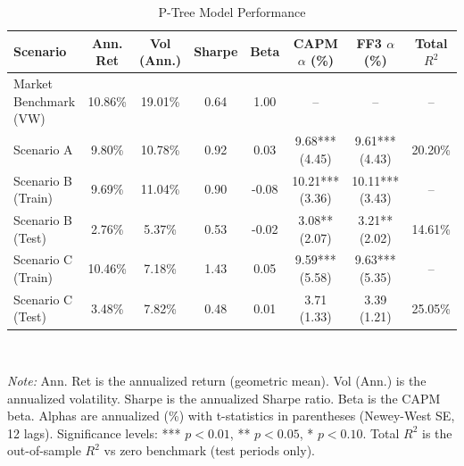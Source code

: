 \begin{table}[!ht]
\centering
\caption{P-Tree Model Performance}
\label{tab:performance}
\begin{tabular}{l *{7}{c}}
\hline
Scenario & Ann. Ret & Vol (Ann.) & Sharpe & Beta & CAPM $\alpha$ (\%) & FF3 $\alpha$ (\%) & Total $R^2$ \\
\hline
Market Benchmark (VW) & 10.86\% & 19.01\% & 0.64 & 1.00 & -- & -- & -- \\
Scenario A & 9.80\% & 10.78\% & 0.92 & 0.03 & 9.68*** (4.45) & 9.61*** (4.43) & 20.20\% \\
Scenario B (Train) & 9.69\% & 11.04\% & 0.90 & -0.08 & 10.21*** (3.36) & 10.11*** (3.43) & -- \\
Scenario B (Test) & 2.76\% & 5.37\% & 0.53 & -0.02 & 3.08** (2.07) & 3.21** (2.02) & 14.61\% \\
Scenario C (Train) & 10.46\% & 7.18\% & 1.43 & 0.05 & 9.59*** (5.58) & 9.63*** (5.35) & -- \\
Scenario C (Test) & 3.48\% & 7.82\% & 0.48 & 0.01 & 3.71 (1.33) & 3.39 (1.21) & 25.05\% \\
\hline
\end{tabular}
\\[0.5em]
\begin{minipage}{0.95\textwidth}
\footnotesize
\textit{Note:} Ann. Ret is the annualized return (geometric mean). Vol (Ann.) is the annualized volatility. Sharpe is the annualized Sharpe ratio. Beta is the CAPM beta. Alphas are annualized (\%) with t-statistics in parentheses (Newey-West SE, 12 lags). Significance levels: *** $p<0.01$, ** $p<0.05$, * $p<0.10$. Total $R^2$ is the out-of-sample $R^2$ vs zero benchmark (test periods only).
\end{minipage}
\end{table}
